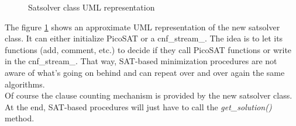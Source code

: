 \begin{figure}[h]
  \centering
  \caption{Satsolver class UML representation}
  \label{fig:sat_uml}
\end{figure}

\noindent The figure \ref{fig:sat_uml} shows an approximate UML representation of the new satsolver class.
It can either initialize PicoSAT or a cnf\_stream\_. The idea is to let its functions (add, comment, etc.)
to decide if they call PicoSAT functions or write in the cnf\_stream\_. That way, SAT-based minimization
procedures are not aware of what's going on behind and can repeat over and over again the same algorithms.\\

\noindent Of course the clause counting mechanism is provided by the new satsolver class. At the end,
SAT-based procedures will just have to call the \textit{get\_solution()} method.\\

